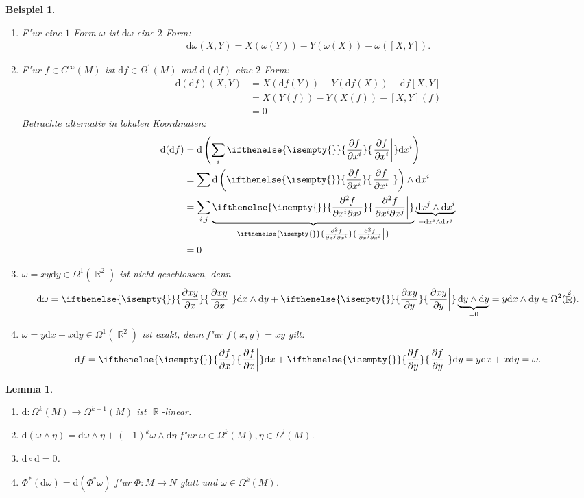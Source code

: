 \documentclass[paper=A4, twoside, chapterprefix=true, bibliography=totoc, headsepline]{scrbook}
\DeclareMathOperator{\R}{\mathbb{R}}
\newcommand{\dop}{\mathrm{d}}
\newcommand{\pdifffrac}[3][]{\ifthenelse{\isempty{#1}}{\frac{\partial #2}{\partial #3}}{\left. \frac{\partial #2}{\partial #3} \right|_{#1}}}
\theoremstyle{plain}
\newtheorem{Lemma}[Dfn]{Lemma}
\theoremstyle{nonumberplain}
\newtheorem{bsp}{Beispiel}
\theoremstyle{empty}
\theoremstyle{break}
\begin{document}
\begin{bsp}
  \begin{enumerate}[label=(\arabic*),leftmargin=*]
  \item F"ur eine $1$-Form $\omega$ ist $\dop \omega$ eine $2$-Form:
    \begin{align*}
      \dop \omega(X,Y) = X(\omega(Y)) - Y(\omega(X)) - \omega([X,Y]).
    \end{align*}
  \item F"ur $f \in C^{\infty}(M)$ ist $\dop f \in \Omega^1(M)$ und $\dop (\dop f)$ eine $2$-Form:
    \begin{align*}
      \dop(\dop f) (X,Y) & = X(\dop f(Y)) - Y(\dop f(X)) - \dop f [X,Y]\\
      & = X(Y(f)) - Y(X(f)) -[X,Y](f)\\
      & = 0
    \end{align*}
    Betrachte alternativ in lokalen Koordinaten:
    \begin{align*}
      \dop(\dop f) & = \dop\left(\sum_i \pdifffrac{f}{x^i}\dop x^i\right)\\
      & = \sum \dop \left(\pdifffrac{f}{x^i}\right) \wedge \dop x^i\\
      & = \sum_{i,j} \underbrace{\pdifffrac{^2 f}{x^i \partial x^j}}_{\pdifffrac{^2f}{x^j \partial x^{i}}} \underbrace{\dop x^j \wedge \dop x^i}_{- \dop x^i \wedge \dop x^{j}}\\
      & = 0
    \end{align*}
  \item $\omega = xy \dop y \in \Omega^1(\R^2)$ ist nicht geschlossen, denn
    \begin{align*}
      \dop \omega = \pdifffrac{xy}{x} \dop x \wedge \dop y + \pdifffrac{xy}{y}\underbrace{ \dop y \wedge \dop y}_{=0} = y \dop x \wedge \dop y \in \Omega^2(\R^2).
    \end{align*}
  \item $\omega = y \dop x + x \dop y \in \Omega^1(\R^2)$ ist exakt, denn f"ur $f(x,y) = xy$ gilt:
    \begin{align*}
      \dop f = \pdifffrac{f}{x}\dop x + \pdifffrac{f}{y}\dop y = y \dop x + x \dop y = \omega.
    \end{align*}
  \end{enumerate}
\end{bsp}

\begin{Lemma}\label{lemma-5-9}
  \begin{enumerate}[label=(\roman*)]
  \item $\dop \colon \Omega^k(M) \to \Omega^{k+1}(M)$ ist $\R$-linear.
  \item $\dop(\omega \wedge \eta) = \dop \omega \wedge \eta + (-1)^k \omega \wedge \dop \eta$ f"ur $\omega \in \Omega^k(M), \eta \in \Omega^l(M)$.
  \item $\dop \circ \dop = 0$.
  \item\label{lemma-5-9-iv} $\Phi^*(\dop \omega) = \dop (\Phi^{*}\omega)$ f"ur $\Phi \colon M \to N$ glatt und $\omega \in \Omega^k(M)$.
  \end{enumerate}
\end{Lemma}
\end{document}
